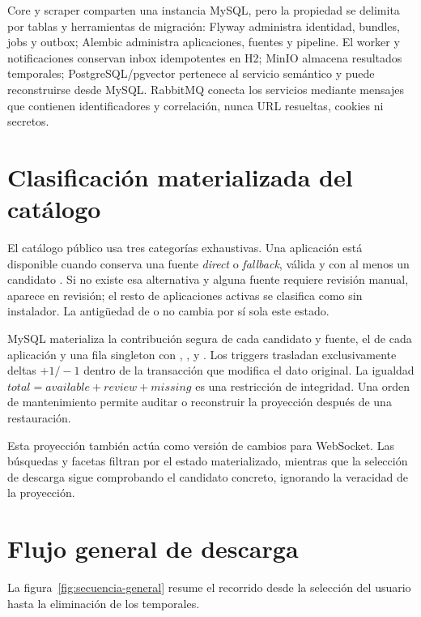 Core y scraper comparten una instancia MySQL, pero la propiedad se delimita por tablas y herramientas de migración: Flyway administra identidad, bundles, jobs y outbox; Alembic administra aplicaciones, fuentes y pipeline. El worker y notificaciones conservan inbox idempotentes en H2; MinIO almacena resultados temporales; PostgreSQL/pgvector pertenece al servicio semántico y puede reconstruirse desde MySQL. RabbitMQ conecta los servicios mediante mensajes que contienen identificadores y correlación, nunca URL resueltas, cookies ni secretos.


\section{Clasificación materializada del catálogo}

El catálogo público usa tres categorías exhaustivas. Una aplicación está disponible cuando conserva una fuente \emph{direct} o \emph{fallback}, válida y con al menos un candidato . Si no existe esa alternativa y alguna fuente requiere revisión manual, aparece en revisión; el resto de aplicaciones activas se clasifica como sin instalador. La antigüedad de  o  no cambia por sí sola este estado.

MySQL materializa la contribución segura de cada candidato y fuente, el  de cada aplicación y una fila singleton con , ,  y . Los triggers trasladan exclusivamente deltas \(+1/-1\) dentro de la transacción que modifica el dato original. La igualdad \(total=available+review+missing\) es una restricción de integridad. Una orden de mantenimiento permite auditar o reconstruir la proyección después de una restauración.

Esta proyección también actúa como versión de cambios para WebSocket. Las búsquedas y facetas filtran por el estado materializado, mientras que la selección de descarga sigue comprobando el candidato concreto, ignorando la veracidad de la proyección.

\section{Flujo general de descarga}

La figura~\ref{fig:secuencia-general} resume el recorrido desde la selección del usuario hasta la eliminación de los temporales.

